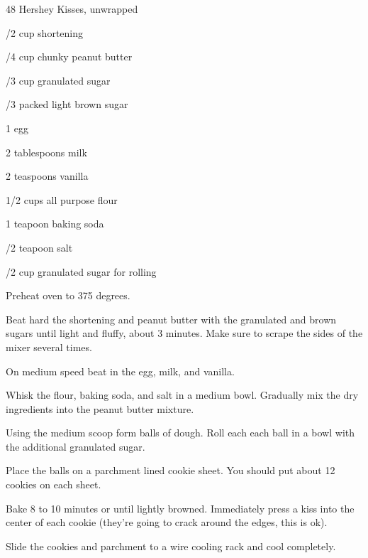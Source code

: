 %
%
%
%
\newpage



\begin{IngredientsAndSteps}
    \ListIngredientsAndSteps
    {
        48 Hershey Kisses, unwrapped

        /2 cup shortening

        /4 cup chunky peanut butter

        /3 cup granulated sugar

        /3 packed light brown sugar

        1 egg

        2 tablespoons milk

        2 teaspoons vanilla

        1/2 cups all purpose flour

        1 teapoon baking soda

        /2 teapoon salt

        /2 cup granulated sugar for rolling
    }
    {
        Preheat oven to 375 degrees.

        Beat hard the shortening and peanut butter with the granulated and brown sugars
        until light and fluffy, about 3 minutes. Make sure to scrape the sides of the
        mixer several times.

        On medium speed beat in the egg, milk, and vanilla.

        Whisk the flour, baking soda, and salt in a medium bowl. Gradually mix the dry ingredients
        into the peanut butter mixture.

        Using the medium scoop form balls of dough. Roll each each ball in a bowl with the
        additional granulated sugar.

        Place the balls on a parchment lined cookie sheet. You should put about 12 cookies
        on each sheet.

        Bake 8 to 10 minutes or until lightly browned. Immediately press a kiss into the center
        of each cookie (they're going to crack around the edges, this is ok).

        Slide the cookies and parchment to a wire cooling rack and cool completely.
    }
\end{IngredientsAndSteps}

%
%
%
%
\newpage

